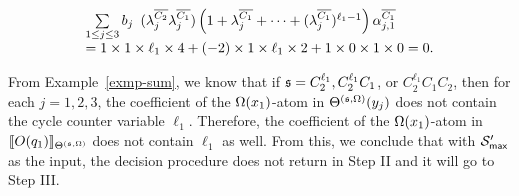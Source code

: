 \begin{example}
\begin{itemize}
\[
\begin{array}{l}
\sum \limits_{1 \le j \le 3} b_j
\begin{array}{l}
 (\lambda^{\overline{C_{2}}}_{j}\lambda^{\overline{C_{1}}}_{j})
\left(1+\lambda^{\overline{C_{1}}}_{j} + \dots + (\lambda^{\overline{C_{1}}}_{j})^{\ell_1-1} \right) \alpha^{\overline{C_{1}}}_{j, 1}
\end{array}
\\
= 1 \times 1 \times \ell_1 \times 4 + (-2) \times 1 \times \ell_1 \times 2 + 1 \times 0 \times 1 \times 0 =0.
\end{array}
\]
\end{itemize}
From Example~\ref{exmp-sum}, we know that if ${\mathfrak{s} }=C^{\ell_1}_2, C^{\ell_1}_2 C_1$, or $C^{\ell_1}_2 C_1 C_2$, then for each $j =1, 2,3$, the coefficient of the $\Omega(x_1)$-atom in $\Theta^{({\mathfrak{s} }, \Omega)}(y_j)$ does not contain the cycle counter variable $\ell_1$. Therefore, the coefficient of the $\Omega(x_1)$-atom in $\llbracket O(q_1)\rrbracket_{\Theta^{({\mathfrak{s} }, \Omega)}}$ does not contain $\ell_1$ as well. From this, we conclude that with ${\mathcal{S} }'_{\sf max}$ as the input, the decision procedure does not return in Step II and it will go to Step III.
\end{example}


